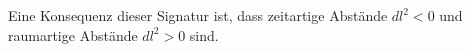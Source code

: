 Eine Konsequenz dieser Signatur ist, dass zeitartige Abstände $dl^2 < 0$ und raumartige Abstände $dl^2 > 0$ sind.
\begin{comment}
\subsection{Herleitung Hodge-Duale (Verweis auf Abschnitt im Buch)}
Wir verwenden die Definition des Hodge-Operators
\begin{equation*}
	\alpha \wedge \ast \beta = \langle \alpha, \beta \rangle \operatorname{vol}(M),
\end{equation*}
wobei \( \langle \cdot , \cdot \rangle \) das durch die Metrik \( g^{ik} \) induzierte Skalarprodukt ist.
Im Folgenden führen wir die Berechnungen der Hodge-Dualen für 1-, 2- und 3-Formen im Minkowski-Raum mit $(-+++)$-Signatur durch. Dabei gilt gemäß Gleichung~\eqref{maxwell:section:teil1:metrik}
\[
g^{ik} = \begin{pmatrix}
	-1 & 0 & 0 & 0 \\ 0 & 1 & 0 & 0 \\ 0 & 0 & 1 & 0 \\ 0 & 0 & 0 & 1 
\end{pmatrix},
\qquad
\operatorname{vol}(M) = dx^0 \wedge dx^1 \wedge dx^2 \wedge dx^3.
\]

\vspace{1em}
\noindent
Um die Notation kompakter und übersichtlicher zu gestalten, führen wir die folgende Kurzschreibweise für antisymmetrische Produkte von Basisformen ein:
\begin{align*}
	dx^{ij} &:= dx^i \wedge dx^j, \\
	dx^{ijk} &:= dx^i \wedge dx^j \wedge dx^k.
\end{align*}
Dabei gehen wir stets von aufsteigend sortierten Indizes \( i < j < k \) aus.


\end{comment}
